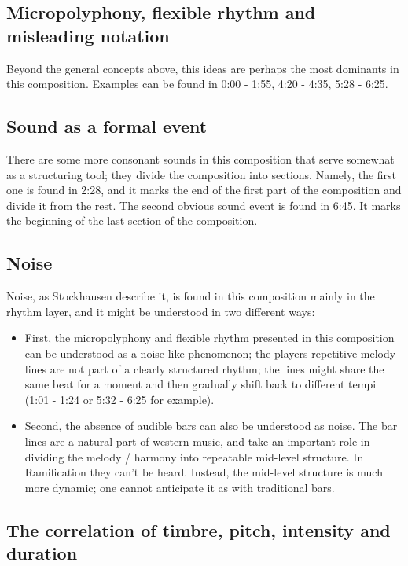\documentclass[a4paper,11pt]{article}
\begin{document}
\subsection*{Micropolyphony, flexible rhythm and misleading notation}

Beyond the general concepts above, this ideas are perhaps the most dominants in this composition.
Examples can be found in 0:00 - 1:55, 4:20 - 4:35, 5:28 - 6:25.

\subsection*{Sound as a formal event}

There are some more consonant sounds in this composition that serve somewhat as a structuring tool;
they divide the composition into sections.
Namely, the first one is found in 2:28, and it marks the end of the first part of the composition and divide it from the rest.
The second obvious sound event is found in 6:45.
It marks the beginning of the last section of the composition.

\subsection*{Noise}

Noise, as Stockhausen describe it, is found in this composition mainly in the rhythm layer, and it might be understood in two different ways:

\begin{itemize}
  \item First, the micropolyphony and flexible rhythm presented in this composition can be understood as a noise like phenomenon;
  the players repetitive melody lines are not part of a clearly structured rhythm;
  the lines might share the same beat for a moment and then gradually shift back to different tempi (1:01 - 1:24 or 5:32 - 6:25 for example).
  \item Second, the absence of audible bars can also be understood as noise.
  The bar lines are a natural part of western music, and take an important role in dividing the melody / harmony into repeatable mid-level structure.
  In Ramification they can't be heard.
  Instead, the mid-level structure is much more dynamic; one cannot anticipate it as with traditional bars.
\end{itemize}

\subsection*{The correlation of timbre, pitch, intensity and duration}
\end{document}
